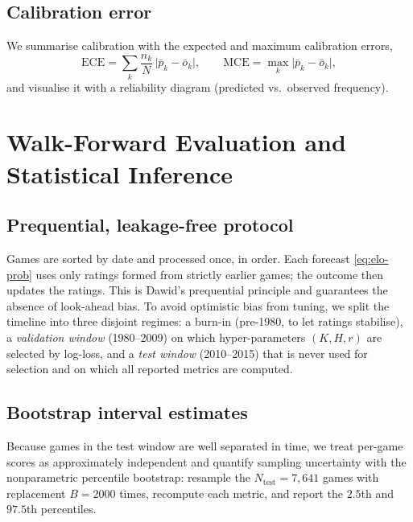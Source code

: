 \documentclass[11pt]{article}
\begin{document}
\subsection{Calibration error}
We summarise calibration with the expected and maximum calibration errors,
\[
\mathrm{ECE} = \sum_{k} \frac{n_k}{N}\,\big|\bar p_k - \bar o_k\big|, \qquad
\mathrm{MCE} = \max_k \big|\bar p_k - \bar o_k\big|,
\]
and visualise it with a reliability diagram (predicted vs.\ observed frequency).

\section{Walk-Forward Evaluation and Statistical Inference}

\subsection{Prequential, leakage-free protocol}
Games are sorted by date and processed once, in order. Each forecast
\eqref{eq:elo-prob} uses only ratings formed from strictly earlier games; the
outcome then updates the ratings. This is Dawid's prequential principle and
guarantees the absence of look-ahead bias. To avoid optimistic bias from tuning,
we split the timeline into three disjoint regimes: a burn-in
(pre-1980, to let ratings stabilise), a \emph{validation window}
(1980--2009) on which hyper-parameters $(K,H,r)$ are selected by log-loss, and a
\emph{test window} (2010--2015) that is never used for selection and on which all
reported metrics are computed.

\subsection{Bootstrap interval estimates}
Because games in the test window are well separated in time, we treat per-game
scores as approximately independent and quantify sampling uncertainty with the
nonparametric percentile bootstrap: resample the $N_{\text{test}} = 7{,}641$ games
with replacement $B = 2000$ times, recompute each metric, and report the
$2.5$th and $97.5$th percentiles.
\end{document}
